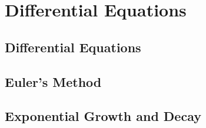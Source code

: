 \documentclass[../bccalc.tex]{subfiles}
\begin{document}
\chapter{Differential Equations}
\section{Differential Equations}

\section{Euler's Method}

\section{Exponential Growth and Decay}
\end{document}
